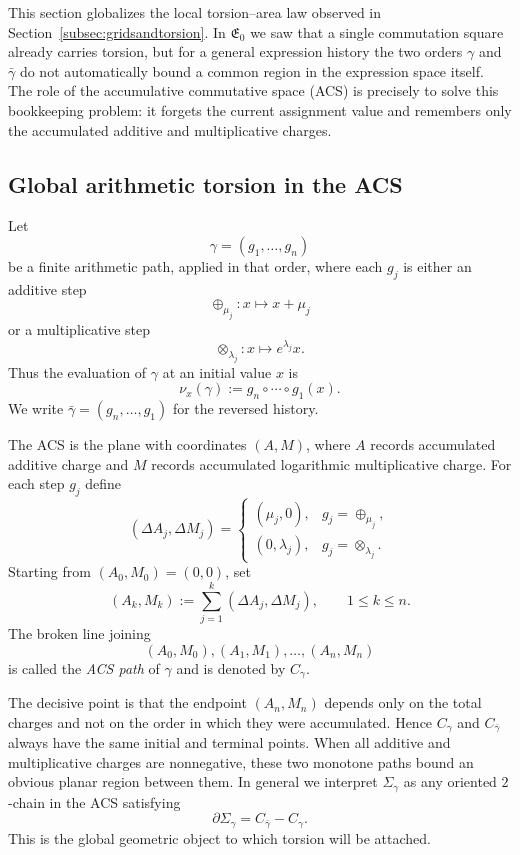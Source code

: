 This section globalizes the local torsion--area law observed in Section~\ref{subsec:gridsandtorsion}. In $\mathfrak{E}_0$ we saw that a single commutation square already carries torsion, but for a general expression history the two orders $\gamma$ and $\bar\gamma$ do not automatically bound a common region in the expression space itself. The role of the accumulative commutative space (ACS) is precisely to solve this bookkeeping problem: it forgets the current assignment value and remembers only the accumulated additive and multiplicative charges.

\subsection{Global arithmetic torsion in the ACS}
\label{sec:global_torsion_acs_narrative_enhanced_lc}

Let
\[
    \gamma=(g_1,\dots,g_n)
\]
be a finite arithmetic path, applied in that order, where each $g_j$ is either an additive step
\[
    \oplus_{\mu_j}:x\mapsto x+\mu_j
\]
or a multiplicative step
\[
    \otimes_{\lambda_j}:x\mapsto e^{\lambda_j}x.
\]
Thus the evaluation of $\gamma$ at an initial value $x$ is
\[
    \nu_x(\gamma):=g_n\circ\cdots\circ g_1(x).
\]
We write $\bar\gamma=(g_n,\dots,g_1)$ for the reversed history.

The ACS is the plane with coordinates $(A,M)$, where $A$ records accumulated additive charge and $M$ records accumulated logarithmic multiplicative charge. For each step $g_j$ define
\[
    (\Delta A_j,\Delta M_j)=
    \begin{cases}
        (\mu_j,0), & g_j=\oplus_{\mu_j},\\[4pt]
        (0,\lambda_j), & g_j=\otimes_{\lambda_j}.
    \end{cases}
\]
Starting from $(A_0,M_0)=(0,0)$, set
\[
    (A_k,M_k):=\sum_{j=1}^k (\Delta A_j,\Delta M_j),
    \qquad 1\le k\le n.
\]
The broken line joining
\[
    (A_0,M_0),(A_1,M_1),\dots,(A_n,M_n)
\]
is called the \emph{ACS path} of $\gamma$ and is denoted by $C_\gamma$.

The decisive point is that the endpoint $(A_n,M_n)$ depends only on the total charges and not on the order in which they were accumulated. Hence $C_\gamma$ and $C_{\bar\gamma}$ always have the same initial and terminal points. When all additive and multiplicative charges are nonnegative, these two monotone paths bound an obvious planar region between them. In general we interpret $\Sigma_\gamma$ as any oriented $2$-chain in the ACS satisfying
\[
    \partial\Sigma_\gamma = C_{\bar\gamma}-C_\gamma.
\]
This is the global geometric object to which torsion will be attached.

